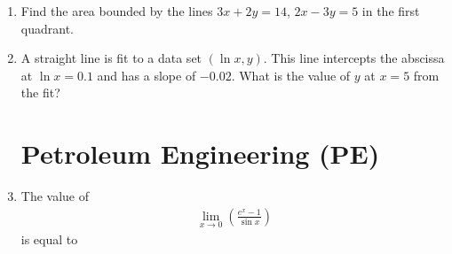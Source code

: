 \documentclass[journal]{IEEEtran}
\begin{document}
\begin{enumerate}
    \begin{enumerate}  \end{enumerate}              
    
    \hfill{}
    
    \item Find the area bounded by the lines $3x+2y=14$, $2x-3y=5$ in the first quadrant.
    
    \begin{enumerate}  \end{enumerate}              
    
    \hfill{}
    
    \item A straight line is fit to a data set $(\ln x, y)$. This line intercepts the abscissa at $\ln x = 0.1$ and has a slope of $-0.02$. What is the value of $y$ at $x = 5$ from the fit?
    
    \begin{enumerate}  \end{enumerate}              
    
    \hfill{}
 
\section*{Petroleum Engineering (PE)}
    \item The value of   
   \begin{align}
 \lim_{x \to 0} \left( \frac{e^x - 1}{\sin x} \right)      
   \end{align} 
    is equal to 
    \hfill{}
    

\end{enumerate}
\end{document}
